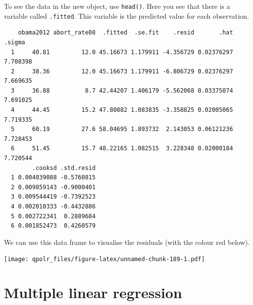 \documentclass[12pt,oneside]{reedthesis}
\theoremstyle{definition}
\theoremstyle{definition}
\theoremstyle{definition}
\theoremstyle{remark}
\begin{document}
  To see the data in the new object, use \texttt{head()}. Here you see
  that there is a variable called \texttt{.fitted}. This variable is the
  predicted value for each observation.
  \begin{Shaded}
  \begin{Highlighting}[]
  \end{Highlighting}
  \end{Shaded}
  \begin{verbatim}
    obama2012 abort_rate08  .fitted  .se.fit    .resid       .hat   .sigma
  1     40.81         12.0 45.16673 1.179911 -4.356729 0.02376297 7.708398
  2     38.36         12.0 45.16673 1.179911 -6.806729 0.02376297 7.669635
  3     36.88          8.7 42.44207 1.406179 -5.562068 0.03375074 7.691025
  4     44.45         15.2 47.80882 1.083835 -3.358825 0.02005065 7.719335
  5     60.19         27.6 58.04695 1.893732  2.143053 0.06121236 7.728453
  6     51.45         15.7 48.22165 1.082515  3.228348 0.02000184 7.720544
        .cooksd .std.resid
  1 0.004039088 -0.5760815
  2 0.009859143 -0.9000401
  3 0.009544419 -0.7392523
  4 0.002010333 -0.4432886
  5 0.002722341  0.2889684
  6 0.001852473  0.4260579
  \end{verbatim}
  We can use this data frame to visualise the residuals (with the colour
  red below).
  \begin{Shaded}
  \begin{Highlighting}[]
  \NormalTok{(}\OperatorTok{+}
  \StringTok{  }\NormalTok{(}\NormalTok{(}
          \NormalTok{) }\OperatorTok{+}
  \StringTok{  }\NormalTok{() }\OperatorTok{+}
  \StringTok{  }\NormalTok{(}\NormalTok{(}
  \end{Highlighting}
  \end{Shaded}
  \texttt{[image: qpolr\_files/figure-latex/unnamed-chunk-189-1.pdf]}
  
  \section{Multiple linear regression}\label{multiple-linear-regression}
  
\end{document}

